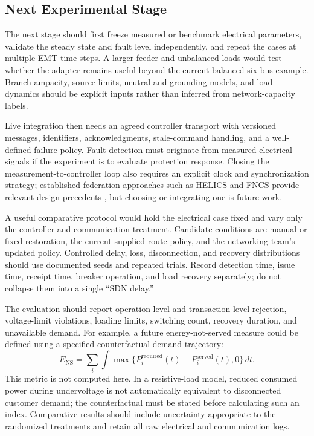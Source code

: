\subsection{Next Experimental Stage}
The next stage should first freeze measured or benchmark electrical
parameters, validate the steady state and fault level independently, and
repeat the cases at multiple EMT time steps. A larger feeder and unbalanced
loads would test whether the adapter remains useful beyond the current
balanced six-bus example. Branch ampacity, source limits, neutral and grounding
models, and load dynamics should be explicit inputs rather than inferred from
network-capacity labels.

Live integration then needs an agreed controller transport with versioned
messages, identifiers, acknowledgments, stale-command handling, and a
well-defined failure policy. Fault detection must originate from measured
electrical signals if the experiment is to evaluate protection response.
Closing the measurement-to-controller loop also requires an explicit clock
and synchronization strategy; established federation approaches such as
HELICS and FNCS provide relevant design precedents
\cite{palmintier2017,ciraci2014}, but choosing or integrating one is future
work.

A useful comparative protocol would hold the electrical case fixed and vary
only the controller and communication treatment. Candidate conditions are
manual or fixed restoration, the current supplied-route policy, and the
networking team's updated policy. Controlled delay, loss, disconnection, and
recovery distributions should use documented seeds and repeated trials.
Record detection time, issue time, receipt time, breaker operation, and load
recovery separately; do not collapse them into a single ``SDN delay.''

The evaluation should report operation-level and transaction-level rejection,
voltage-limit violations, loading limits, switching count, recovery duration,
and unavailable demand. For example, a future energy-not-served measure could
be defined using a specified counterfactual demand trajectory:
\begin{equation}
 E_{\mathrm{NS}}=\sum_i\int
 \max\{P_i^{\mathrm{required}}(t)-P_i^{\mathrm{served}}(t),0\}\,dt.
\end{equation}
This metric is not computed here. In a resistive-load model, reduced consumed
power during undervoltage is not automatically equivalent to disconnected
customer demand; the counterfactual must be stated before calculating such
an index. Comparative results should include uncertainty appropriate to the
randomized treatments and retain all raw electrical and communication logs.
